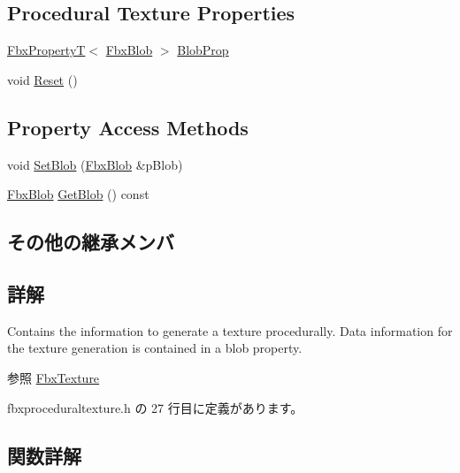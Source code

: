 \subsection*{Procedural Texture Properties}
\begin{DoxyCompactItemize}
\item 
\hyperlink{class_fbx_property_t}{Fbx\+PropertyT}$<$ \hyperlink{class_fbx_blob}{Fbx\+Blob} $>$ \hyperlink{class_fbx_procedural_texture_aaf3a45d4b05897639d7c6a8e9d8a1b69}{Blob\+Prop}
\item 
void \hyperlink{class_fbx_procedural_texture_ad98e91a632bfbd9f29ee537cbe4ff180}{Reset} ()
\end{DoxyCompactItemize}
\subsection*{Property Access Methods}
\begin{DoxyCompactItemize}
\item 
void \hyperlink{class_fbx_procedural_texture_a474dd437337ac1f76e7b9c77b7af45ee}{Set\+Blob} (\hyperlink{class_fbx_blob}{Fbx\+Blob} \&p\+Blob)
\item 
\hyperlink{class_fbx_blob}{Fbx\+Blob} \hyperlink{class_fbx_procedural_texture_a89d29f48ef80fa46c0ebb3ade036952a}{Get\+Blob} () const
\end{DoxyCompactItemize}
\subsection*{その他の継承メンバ}


\subsection{詳解}
Contains the information to generate a texture procedurally. Data information for the texture generation is contained in a blob property. \begin{DoxySeeAlso}{参照}
\hyperlink{class_fbx_texture}{Fbx\+Texture} 
\end{DoxySeeAlso}


 fbxproceduraltexture.\+h の 27 行目に定義があります。



\subsection{関数詳解}
\mbox{\label{class_fbx_procedural_texture_a2386483aef2766c16c911e6fd6539d32}} 
